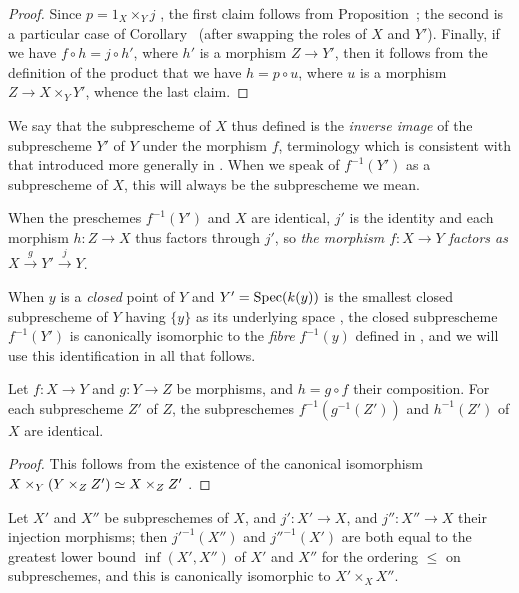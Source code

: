 \begin{proof}
Since $p=1_X\times_Y j$ , the first claim follows from Proposition~;
the second is a particular case of Corollary~ (after swapping the roles of $X$ and $Y'$).
Finally, if we have $f\circ h=j\circ h'$, where $h'$ is a morphism $Z\to Y'$, then it follows from the definition of the product that we have $h=p\circ u$, where $u$ is a morphism $Z\to X\times_Y Y'$, whence the last claim.
\end{proof}

We say that the subprescheme of $X$ thus defined is the \emph{inverse image} of the subprescheme $Y'$ of $Y$ under the morphism $f$, terminology which is consistent with that introduced
more generally in .
When we speak of $f^{-1}(Y')$ as a subprescheme of $X$, this will always be the subprescheme we mean.

When the preschemes $f^{-1}(Y')$ and $X$ are identical, $j'$ is the identity and each morphism $h:Z\to X$ thus factors through $j'$, so \emph{the morphism $f:X\to Y$ factors as $X\xrightarrow{g}Y'\xrightarrow{j}Y$}.

When $y$ is a \emph{closed} point of $Y$ and $Y'=\operatorname{Spec}(k(y))$ is the smallest closed subprescheme of $Y$ having $\{y\}$ as its underlying space , the closed subprescheme $f^{-1}(Y')$ is canonically isomorphic to the \emph{fibre} $f^{-1}(y)$ defined in , and we will use this identification in all that follows.

\begin{corollary}[4.4.2]
\label{I.4.4.2}
Let $f:X\to Y$ and $g:Y\to Z$ be morphisms, and $h=g\circ f$ their composition.
For each subprescheme $Z'$ of $Z$, the subpreschemes $f^{-1}(g^{-1}(Z'))$ and $h^{-1}(Z')$ of $X$ are identical.
\end{corollary}

\begin{proof}
This follows from the existence of the canonical isomorphism $X\times_Y(Y\times_Z Z')\simeq X\times_Z Z'$ .
\end{proof}

\begin{corollary}[4.4.3]
\label{I.4.4.3}
Let $X'$ and $X''$ be subpreschemes of $X$, and $j':X'\to X$, and $j'':X''\to X$ their injection morphisms;
then ${j'}^{-1}(X'')$ and ${j''}^{-1}(X')$ are both equal to the greatest lower bound $\inf(X',X'')$ of $X'$ and $X''$ for the ordering $\leq$ on subpreschemes, and this is canonically isomorphic to $X'\times_X X''$.
\end{corollary}

